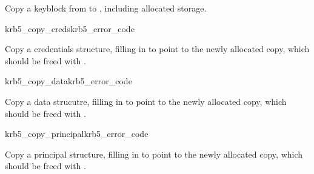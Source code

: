 Copy a keyblock from  to , including
allocated storage.

\begin{funcdecl}{krb5_copy_creds}{krb5_error_code}{\funcin}
\funcout
{}
\end{funcdecl}

Copy a credentials structure, filling in  to point
to the newly allocated copy, which should be freed with
.

\begin{funcdecl}{krb5_copy_data}{krb5_error_code}{\funcin}
\funcout
{}
\end{funcdecl}

Copy a data strucutre, filling in  to point to the
newly allocated copy, which should be freed with .

\begin{funcdecl}{krb5_copy_principal}{krb5_error_code}{\funcin}
\funcout
{}
\end{funcdecl}
Copy a principal structure, filling in  to point to
the newly allocated copy, which should be freed with
.

